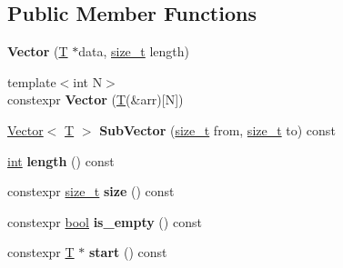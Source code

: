 \subsection*{Public Member Functions}
\begin{DoxyCompactItemize}
\item 
\mbox{\label{classv8_1_1internal_1_1Vector_ac1130aaf93d4dafd2b3ab4fa5f682dc6}} 
{\bfseries Vector} (\mbox{\hyperlink{classv8_1_1internal_1_1torque_1_1T}{T}} $\ast$data, \mbox{\hyperlink{classsize__t}{size\+\_\+t}} length)
\item 
\mbox{\label{classv8_1_1internal_1_1Vector_a5dc26cc5eda4888889be2681cc2c2943}} 
{\footnotesize template$<$int N$>$ }\\constexpr {\bfseries Vector} (\mbox{\hyperlink{classv8_1_1internal_1_1torque_1_1T}{T}}(\&arr)\mbox{[}N\mbox{]})
\item 
\mbox{\label{classv8_1_1internal_1_1Vector_a88abd2e2c1145d4f7d30f7f295fbc202}} 
\mbox{\hyperlink{classv8_1_1internal_1_1Vector}{Vector}}$<$ \mbox{\hyperlink{classv8_1_1internal_1_1torque_1_1T}{T}} $>$ {\bfseries Sub\+Vector} (\mbox{\hyperlink{classsize__t}{size\+\_\+t}} from, \mbox{\hyperlink{classsize__t}{size\+\_\+t}} to) const
\item 
\mbox{\label{classv8_1_1internal_1_1Vector_a7f4f3f63b2fa04ea5909215e68de63c4}} 
\mbox{\hyperlink{classint}{int}} {\bfseries length} () const
\item 
\mbox{\label{classv8_1_1internal_1_1Vector_a68ff19ddd52e309ce207e6382f5d8d91}} 
constexpr \mbox{\hyperlink{classsize__t}{size\+\_\+t}} {\bfseries size} () const
\item 
\mbox{\label{classv8_1_1internal_1_1Vector_a0fa956176baa51b8fbd3dd5c115aefcf}} 
constexpr \mbox{\hyperlink{classbool}{bool}} {\bfseries is\+\_\+empty} () const
\item 
\mbox{\label{classv8_1_1internal_1_1Vector_aca4f1e5182c6822c6a103030d56a437a}} 
constexpr \mbox{\hyperlink{classv8_1_1internal_1_1torque_1_1T}{T}} $\ast$ {\bfseries start} () const

\end{DoxyCompactItemize}
